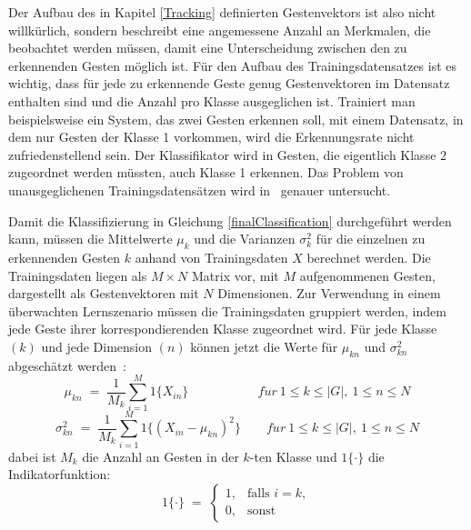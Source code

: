 Der Aufbau des in Kapitel \ref{Tracking} definierten Gestenvektors ist also nicht willkürlich, sondern beschreibt eine angemessene Anzahl an Merkmalen, die beobachtet werden müssen, damit eine Unterscheidung zwischen den zu erkennenden Gesten möglich ist. Für den Aufbau des Trainingsdatensatzes ist es wichtig, dass für jede zu erkennende Geste genug Gestenvektoren im Datensatz enthalten sind und die Anzahl pro Klasse ausgeglichen ist. Trainiert man beispielsweise ein System, das zwei Gesten erkennen soll, mit einem Datensatz, in dem nur Gesten der Klasse 1 vorkommen, wird die Erkennungsrate nicht zufriedenstellend sein. Der Klassifikator wird in Gesten, die eigentlich Klasse 2 zugeordnet werden müssten, auch Klasse 1 erkennen. Das Problem von unausgeglichenen Trainingsdatensätzen wird in~\cite{unbalancedSamples} genauer untersucht. 

Damit die Klassifizierung in Gleichung \eqref{finalClassification} durchgeführt werden kann, müssen die Mittelwerte $\mu_k$ und die Varianzen $\sigma^2_k$ für die einzelnen zu erkennenden Gesten $k$ anhand von Trainingsdaten $X$ berechnet werden. Die Trainingsdaten liegen als $M\times N$ Matrix vor, mit $M$ aufgenommenen Gesten, dargestellt als Gestenvektoren mit $N$ Dimensionen. Zur Verwendung in einem überwachten Lernszenario müssen die Trainingsdaten gruppiert werden, indem jede Geste ihrer korrespondierenden Klasse zugeordnet wird. Für jede Klasse $(k)$ und jede Dimension $(n)$ können jetzt die Werte für $\mu_{kn}$ und $\sigma^2_{kn}$ abgeschätzt werden~\cite{gillianANBC}:
\begin{equation}
    \mu_{kn} \; = \; \frac{1}{M_k} \sum_{i=1}^M 1{\{X_{in}}\} \qquad \qquad \quad \ \ 
    f\ddot{u}r \ 1\leq k \leq |G|,\ 1\leq n\leq N
\end{equation}
\begin{equation}
    \sigma_{kn}^2 \; = \; \frac{1}{M_k} \sum_{i=1}^M 1{\{(X_{in} - \mu_{kn})^2}\} \qquad 
    f\ddot{u}r \ 1\leq k \leq |G|,\ 1\leq n\leq N
\end{equation}
dabei ist $M_k$ die Anzahl an Gesten in der $k$-ten Klasse und $1\{\cdot\}$ die Indikatorfunktion:
\begin{equation}
    1\{\cdot\} \; = \; \begin{cases}
                            1,&{\text{falls }}i=k,\\0,&{\text{sonst}}
                       \end{cases}
\end{equation}
 
